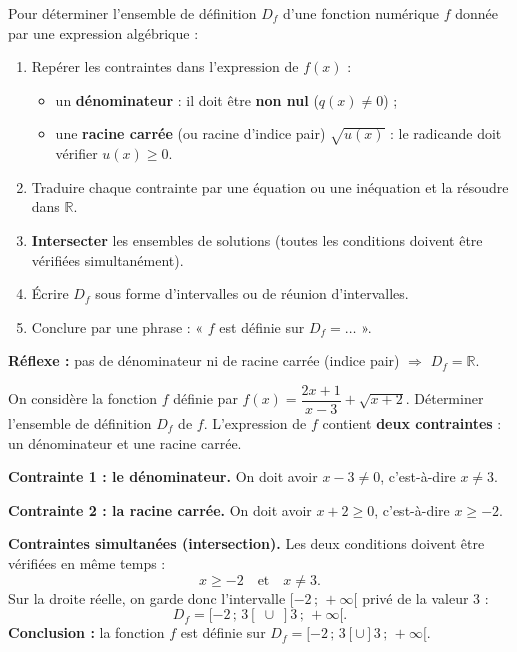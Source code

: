 \documentclass[11pt]{article}
\newcommand{\cle}[1]{{\popxbold\color{popdark}#1}}
\begin{document}
\begin{methode}
Pour déterminer l'ensemble de définition $D_f$ d'une fonction numérique $f$ donnée par une expression algébrique :
\begin{enumerate}
\item Repérer les \cle{contraintes} dans l'expression de $f(x)$ :
\begin{itemize}
\item un \textbf{dénominateur} : il doit être \textbf{non nul} ($q(x) \neq 0$) ;
\item une \textbf{racine carrée} (ou racine d'indice pair) $\sqrt{u(x)}$ : le radicande doit vérifier $u(x) \geq 0$.
\end{itemize}
\item Traduire chaque contrainte par une équation ou une inéquation et la résoudre dans $\mathbb{R}$.
\item \textbf{Intersecter} les ensembles de solutions (toutes les conditions doivent être vérifiées simultanément).
\item Écrire $D_f$ sous forme d'intervalles ou de réunion d'intervalles.
\item Conclure par une phrase : « $f$ est définie sur $D_f = \ldots$ ».
\end{enumerate}
\textbf{Réflexe :} pas de dénominateur ni de racine carrée (indice pair) $\Rightarrow$ $D_f = \mathbb{R}$.
\end{methode}

\begin{exoresolu}
On considère la fonction $f$ définie par $f(x) = \dfrac{2x+1}{x-3} + \sqrt{x+2}$.
Déterminer l'ensemble de définition $D_f$ de $f$.
\tcblower
L'expression de $f$ contient \textbf{deux contraintes} : un dénominateur et une racine carrée.

\textbf{Contrainte 1 : le dénominateur.} On doit avoir $x - 3 \neq 0$, c'est-à-dire $x \neq 3$.

\textbf{Contrainte 2 : la racine carrée.} On doit avoir $x + 2 \geq 0$, c'est-à-dire $x \geq -2$.

\textbf{Contraintes simultanées (intersection).} Les deux conditions doivent être vérifiées en même temps :
\[ x \geq -2 \quad \text{et} \quad x \neq 3. \]
Sur la droite réelle, on garde donc l'intervalle $[-2\,;\,+\infty[$ privé de la valeur $3$ :
\[ D_f = [-2\,;\,3[ \;\cup\; ]3\,;\,+\infty[. \]
\textbf{Conclusion :} la fonction $f$ est définie sur $D_f = [-2\,;\,3[ \cup ]3\,;\,+\infty[$.
\end{exoresolu}
\end{document}
